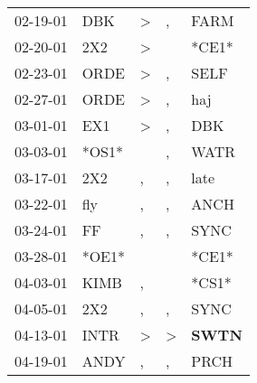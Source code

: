 \begin{supertabular}{p{0.07\textwidth}p{0.06\textwidth}p{0.02\textwidth}p{0.02\textwidth}p{0.06\textwidth}}
          02-19-01\textsuperscript{} &            DBK\textsuperscript{} &     \textgreater &                , &           FARM\textsuperscript{} \\
          02-20-01\textsuperscript{} &            2X2\textsuperscript{} &     \textgreater &                  &                            *CE1* \\
          02-23-01\textsuperscript{} &           ORDE\textsuperscript{} &     \textgreater &                , &           SELF\textsuperscript{} \\
          02-27-01\textsuperscript{} &           ORDE\textsuperscript{} &     \textgreater &                , &            haj\textsuperscript{} \\
          03-01-01\textsuperscript{} &            EX1\textsuperscript{} &     \textgreater &                , &            DBK\textsuperscript{} \\
          03-03-01\textsuperscript{} &                            *OS1* &                  &                , &           WATR\textsuperscript{} \\
          03-17-01\textsuperscript{} &            2X2\textsuperscript{} &                , &                , &           late\textsuperscript{} \\
          03-22-01\textsuperscript{} &            fly\textsuperscript{} &                , &                , &           ANCH\textsuperscript{} \\
          03-24-01\textsuperscript{} &             FF\textsuperscript{} &                , &                , &           SYNC\textsuperscript{} \\
          03-28-01\textsuperscript{} &                            *OE1* &                  &                  &                            *CE1* \\
          04-03-01\textsuperscript{} &           KIMB\textsuperscript{} &                , &                  &                            *CS1* \\
          04-05-01\textsuperscript{} &            2X2\textsuperscript{} &                , &                , &           SYNC\textsuperscript{} \\
          04-13-01\textsuperscript{} &           INTR\textsuperscript{} &     \textgreater &     \textgreater &  \textbf{SWTN\textsuperscript{}} \\
          04-19-01\textsuperscript{} &           ANDY\textsuperscript{} &                , &                , &           PRCH\textsuperscript{} \\

\end{supertabular}
